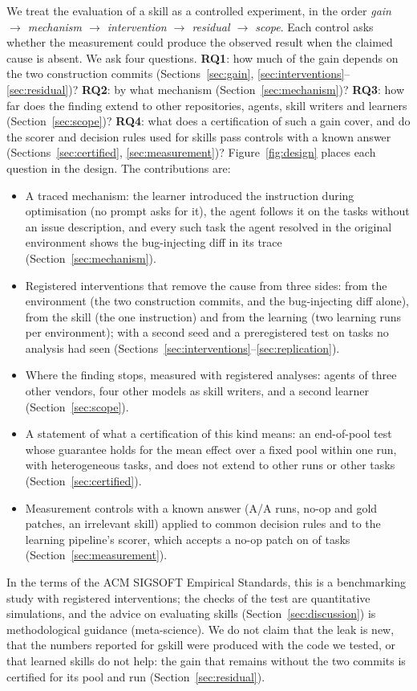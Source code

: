 \documentclass[sigconf,review,anonymous]{acmart}
\begin{document}
We treat the evaluation of a skill as a controlled experiment, in the order
\emph{gain $\rightarrow$ mechanism $\rightarrow$ intervention $\rightarrow$ residual $\rightarrow$
scope}. Each control asks whether the measurement could produce the observed result when the
claimed cause is absent. We ask four questions.
\textbf{RQ1}: how much of the gain depends on the two construction commits
(Sections~\ref{sec:gain}, \ref{sec:interventions}--\ref{sec:residual})?
\textbf{RQ2}: by what mechanism (Section~\ref{sec:mechanism})?
\textbf{RQ3}: how far does the finding extend to other repositories, agents, skill writers and
learners (Section~\ref{sec:scope})?
\textbf{RQ4}: what does a certification of such a gain cover, and do the scorer and decision rules
used for skills pass controls with a known answer (Sections~\ref{sec:certified},
\ref{sec:measurement})? Figure~\ref{fig:design} places each question in the design. The contributions are:
\begin{itemize}
\item A traced mechanism: the learner introduced the instruction during optimisation (no prompt asks
      for it), the agent follows it on the tasks without an issue description, and every such task
      the agent resolved in the original environment shows the bug-injecting diff in its trace
      (Section~\ref{sec:mechanism}).
\item Registered interventions that remove the cause from three sides: from the environment
      (the two construction commits, and the bug-injecting diff alone), from the skill (the one
      instruction) and from the learning (two learning runs per environment); with a second seed and
      a preregistered test on tasks no analysis had seen
      (Sections~\ref{sec:interventions}--\ref{sec:replication}).
\item Where the finding stops, measured with registered analyses: agents of three other vendors,
      four other models as skill writers, and a second learner (Section~\ref{sec:scope}).
\item A statement of what a certification of this kind means: an end-of-pool test whose guarantee
      holds for the mean effect over a fixed pool within one run, with heterogeneous tasks, and does
      not extend to other runs or other tasks (Section~\ref{sec:certified}).
\item Measurement controls with a known answer (A/A runs, no-op and gold patches, an irrelevant
      skill) applied to common decision rules and to the learning pipeline's scorer, which accepts a
      no-op patch on \nfzeroLNoop{} of \nfzeroN{} tasks (Section~\ref{sec:measurement}).
\end{itemize}
In the terms of the ACM SIGSOFT Empirical Standards, this is a benchmarking study with registered
interventions; the checks of the test are quantitative simulations, and the advice on evaluating
skills (Section~\ref{sec:discussion}) is methodological guidance (meta-science).
We do not claim that the leak is new, that the numbers reported for gskill were produced with the
code we tested, or that learned skills do not help: the gain that remains without the two commits is
certified for its pool and run (Section~\ref{sec:residual}).
\end{document}
